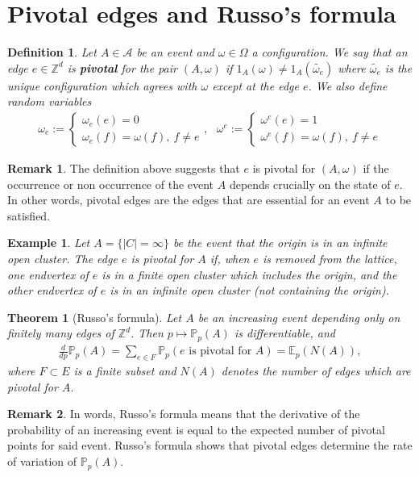 \documentclass[12pt,a4paper]{article}
\newtheorem{thm}{Theorem}[section]
\newtheorem{defn}{Definition}[section]
\newtheorem{exmp}{Example}[section]
\theoremstyle{definition}
\newtheorem{rem}{Remark}[section]
\begin{document}
\section{Pivotal edges and Russo's formula}
\begin{defn} Let $A \in \mathcal{A}$ be an event and $\omega \in \Omega$ a configuration. We say that an edge $e \in \mathbb{Z}^d$ is \textbf{pivotal} for the pair $(A, \omega)$ if $1_A(\omega) \neq 1_A( \widetilde{\omega_e})$ where $\widetilde{\omega_e}$ is the unique configuration which agrees with $\omega$ except at the edge $e$. We also define random variables 
\begin{align*}
\omega_e := \begin{cases} \omega_e(e)=0 \\ \omega_e(f)= \omega(f), \ f \neq e  \end{cases}, \  \ \ \omega^e := \begin{cases} \omega^e(e)=1 \\ \omega^e(f) = \omega(f), \ f \neq e \end{cases}
\end{align*}
\end{defn}
\begin{rem} The definition above suggests that $e$ is pivotal for $(A, \omega)$ if the occurrence or non occurrence of the event $A$ depends crucially on the state of $e$. In other words, pivotal edges are the edges that are essential for an event $A$ to be satisfied. 
\end{rem}
\begin{exmp} Let $A= \{ |C| = \infty\}$ be the event that the origin is in an infinite open cluster. The edge $e$ is pivotal for $A$ if, when $e$ is removed from the lattice, one endvertex of $e$ is in a finite open cluster which includes the origin, and the other endvertex of $e$ is in an infinite open cluster (not containing the origin).
\end{exmp}
\begin{thm}[Russo's formula] Let $A$ be an increasing event depending only on finitely many edges of $\mathbb{Z}^d$. Then $p \mapsto \mathbb{P}_p(A)$ is differentiable, and 
\begin{align*}
\frac{d}{dp} \mathbb{P}_p(A) = \sum_{e \in F} \mathbb{P}_p (e \text{ is pivotal for }A) = \mathbb{E}_p(N(A)),
\end{align*}
where $F \subset E$ is a finite subset and $N(A)$ denotes the number of edges which are pivotal for $A$. 
\end{thm}
\begin{rem} In words, Russo's formula means that the derivative of the probability of an increasing event is equal to the expected number of pivotal points for said event. Russo's formula shows that pivotal edges determine the rate of variation of $\mathbb{P}_p(A)$. 
\end{rem}
\end{document}
